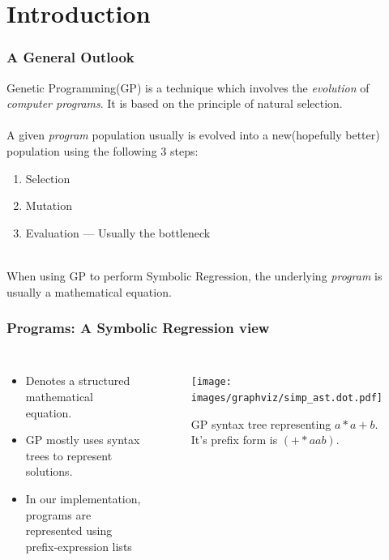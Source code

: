\documentclass{beamer}
\begin{document}
\section{Introduction}

\begin{frame}
  \frametitle{A General Outlook}
  Genetic Programming(GP) is a technique which involves the \textit{evolution} of \textit{computer programs}. It is based on the principle of natural selection.\\~\\

  A given \textit{program} population usually is evolved into a new(hopefully better) population using the following $3$ steps:
  \begin{enumerate}
    \item Selection
    \item Mutation
    \item Evaluation --- Usually the bottleneck
  \end{enumerate}
  ~\\
  When using GP to perform Symbolic Regression, the underlying \textit{program} is usually a mathematical equation.
\end{frame}
    
\begin{frame}
  \frametitle{Programs: A Symbolic Regression view}
  \begin{columns}[c]
    \begin{itemize}
      \item Denotes a structured mathematical equation. 
      \item GP mostly uses syntax trees to represent solutions. 
      \item In our implementation, programs are represented using prefix-expression lists
    \end{itemize}

    \begin{figure}[h]
      \centering
      \texttt{[image: images/graphviz/simp\_ast.dot.pdf]}
      \caption{GP syntax tree representing $a*a+b$. It's prefix form is $(+ * a a b)$.}
      \label{fig:simpast}
    \end{figure}
  \end{columns}
\end{frame}
\end{document}
